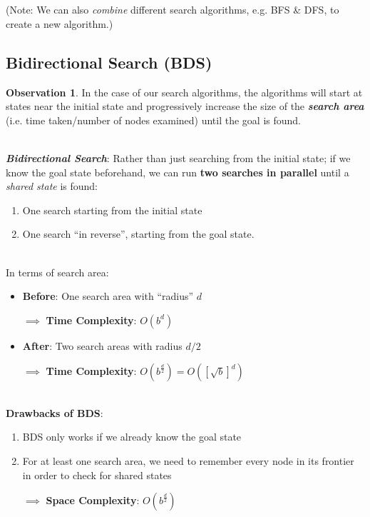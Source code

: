 \documentclass[12pt]{extarticle}
\theoremstyle{definition}
\newtheorem*{observation}{Observation}
\theoremstyle{remark}
\newcommand{\pstart}[0]{\noindent}
\newcommand{\term}[1]{\noindent\textbf{\textit{#1}}}
\begin{document}
~\\~\\
(Note: We can also \textit{combine} different search algorithms, e.g. BFS \& DFS, to create a new algorithm.)

\pagebreak
\subsection{Bidirectional Search (BDS)}
\begin{observation}
    In the case of our search algorithms, the algorithms will start at states near the initial state and progressively increase the size of the \term{search area} (i.e. time taken/number of nodes examined) until the goal is found.
\end{observation}

~\\
\term{Bidirectional Search}: Rather than just searching from the initial state; if we know the goal state beforehand, we can run \textbf{two searches in parallel} until a \textit{shared state} is found: \begin{enumerate}
    \item One search starting from the initial state
    \item One search ``in reverse'', starting from the goal state. 
\end{enumerate}

~\\ \pstart
In terms of search area: \begin{itemize}
    \item[] \textbf{Before}: One search area with ``radius'' $d$

    \qquad$\implies$ \textbf{Time Complexity}: $O(b^d)$
    \item[] \textbf{After}: Two search areas with radius $d/2$
    
    \qquad$\implies$ \textbf{Time Complexity}: $O(b^{\frac{d}{2}})=O\left(\left[\sqrt{b}\right]^d\right)$
\end{itemize}

~\\ \pstart
\textbf{Drawbacks of BDS}: \begin{enumerate}
    \item BDS only works if we already know the goal state
    \item For at least one search area, we need to remember every node in its frontier in order to check for shared states

    \quad$\implies$ \textbf{Space Complexity}: $O(b^{\frac{d}{2}})$
\end{enumerate}
\end{document}
